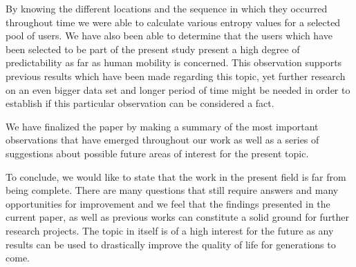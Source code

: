 By knowing the different locations and the sequence in which they occurred
throughout time we were able to calculate various entropy values for a selected
pool of users. We have also been able to determine that the users which have
been selected to be part of the present study present a high degree of
predictability as far as human mobility is concerned. This observation supports
previous results which have been made regarding this topic, yet further research
on an even bigger data set and longer period of time might be needed in order to
establish if this particular observation can be considered a fact.

We have finalized the paper by making a summary of the most important
observations that have emerged throughout our work as well as a series of
suggestions about possible future areas of interest for the present topic.

To conclude, we would like to state that the work in the present field is far
from being complete. There are many questions that still require answers and
many opportunities for improvement and we feel that the findings presented in
the current paper, as well as previous works can constitute a solid ground for
further research projects. The topic in itself is of a high interest for the
future as any results can be used to drastically improve the quality of life for
generations to come.